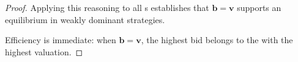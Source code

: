 \documentclass[12pt,a4paper]{scrartcl}
\theoremstyle{remark} %
\begin{document}
\begin{module}[id=vickrey]
\begin{proof}
    Applying this reasoning to all {\bidder}s establishes that $\bm{b} = \bm{v}$ supports an equilibrium in weakly dominant strategies.

    Efficiency is immediate: when $\bm{b} = \bm{v}$, the highest bid belongs to the \bidder with the highest valuation.
  \end{proof}

\end{module}

\printbibliography
\end{document}
